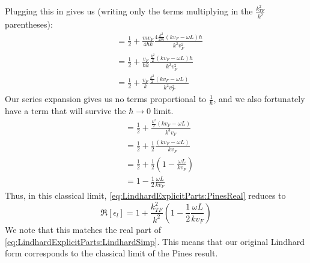 \documentclass[../../main.tex]{subfiles}
\newcommand{\vf}{v_F}
\begin{document}
Plugging this in gives us (writing only the terms multiplying in the $\frac{k_{TF}^2}{k^2}$ parentheses):
\begin{align}
	&= \frac12 + \frac{m \vf}{4 \hbar k} \frac{4 \frac{k^2}{2m} \left(k \vf - \omega L \right)\hbar}{k^2 \vf^2} \\
	&= \frac12 + \frac{ \vf}{ \hbar k} \frac{ \frac{k^2}{2} \left(k \vf - \omega L \right)\hbar}{k^2 \vf^2} \\
	&= \frac12 + \frac{ \vf}{ k} \frac{ \frac{k^2}{2} \left(k \vf - \omega L \right)}{k^2 \vf^2}
\end{align}
Our series expansion gives us no terms proportional to $\frac{1}{\hbar}$, and we also fortunately have a term that will survive the $\hbar \rightarrow 0$ limit.
\begin{align}
	&= \frac12 + \frac{ \frac{k^2}{2} \left(k \vf - \omega L \right)}{k^3 \vf} \\
	&= \frac12 + \frac12 \frac{\left(k \vf - \omega L \right)}{k \vf} \\
	&= \frac12 + \frac12 \left( 1 - \frac{\omega L}{k\vf} \right) \\
	&= 1 - \frac12 \frac{\omega L}{k \vf}
\end{align}
Thus, in this classical limit, \eqref{eq:LindhardExplicitParts:PinesReal} reduces to
\begin{equation}
	\Re[\epsilon_l] = 1 + \frac{k_{TF}^2}{k^2} \left(1 - \frac12 \frac{\omega L}{k \vf} \right)
\end{equation}
We note that this matches the real part of \eqref{eq:LindhardExplicitParts:LindhardSimp}. This means that our original Lindhard form corresponds to the classical limit of the Pines result.
\end{document}
